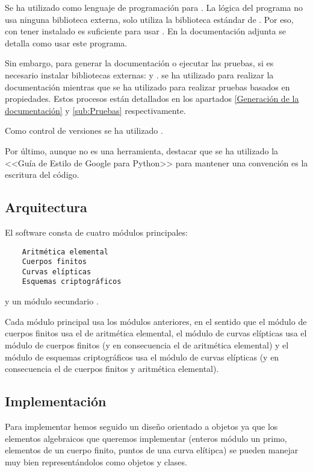 Se ha utilizado  como lenguaje de programación para . La lógica del programa no usa ninguna biblioteca externa, solo utiliza la biblioteca estándar de . Por eso, con tener  instalado es suficiente para usar . En la documentación adjunta se detalla como usar este programa.

Sin embargo, para generar la documentación o ejecutar las pruebas, si es necesario instalar bibliotecas externas:  y .  se ha utilizado para realizar la documentación mientras que  se ha utilizado para realizar pruebas basados en propiedades. Estos procesos están detallados en los apartados \ref{Generación de la documentación} y \ref{sub:Pruebas} respectivamente.

Como control de versiones se ha utilizado .

Por último, aunque no es una herramienta, destacar que se ha utilizado la <<Guía de Estilo de Google para Python>> para mantener una convención es la escritura del código.

\subsection{Arquitectura}
\label{sub:Arquitectura}

El software  consta de cuatro módulos principales:
\begin{verbatim}
    Aritmética elemental
    Cuerpos finitos
    Curvas elípticas
    Esquemas criptográficos
\end{verbatim}
y un módulo secundario .

Cada módulo principal usa los módulos anteriores, en el sentido que el módulo de cuerpos finitos usa el de aritmética elemental, el módulo de curvas elípticas usa el módulo de cuerpos finitos (y en consecuencia el de aritmética elemental) y el módulo de esquemas criptográficos usa el módulo de curvas elípticas (y en consecuencia el de cuerpos finitos y aritmética elemental).

\subsection{Implementación}
\label{sub:Implementación}

Para implementar  hemos seguido un diseño orientado a objetos ya que los elementos algebraicos que queremos implementar (enteros módulo un primo, elementos de un cuerpo finito, puntos de una curva elítipca) se pueden manejar muy bien representándolos como objetos y clases.

